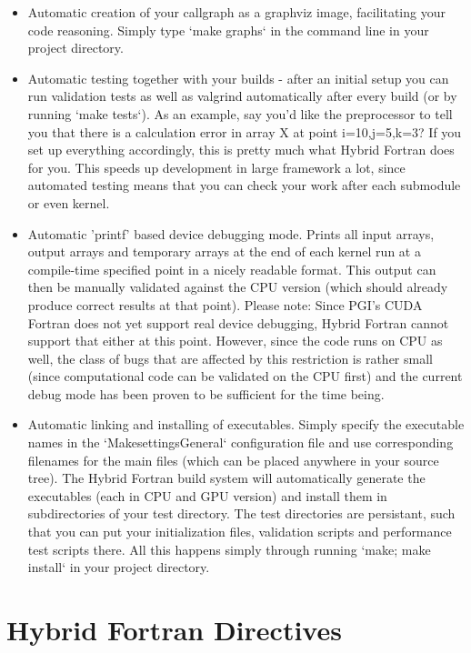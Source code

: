 \begin{itemize}
 \item Automatic creation of your callgraph as a graphviz image, facilitating your code reasoning. Simply type `make graphs` in the command line in your project directory.

 \item Automatic testing together with your builds - after an initial setup you can run validation tests as well as valgrind automatically after every build (or by running `make tests`). As an example, say you'd like the preprocessor to tell you that there is a calculation error in array X at point i=10,j=5,k=3? If you set up everything accordingly, this is pretty much what Hybrid Fortran does for you. This speeds up development in large framework a lot, since automated testing means that you can check your work after each submodule or even kernel.

 \item Automatic 'printf' based device debugging mode. Prints all input arrays, output arrays and temporary arrays at the end of each kernel run at a compile-time specified point in a nicely readable format. This output can then be manually validated against the CPU version (which should already produce correct results at that point). Please note: Since PGI's CUDA Fortran does not yet support real device debugging, Hybrid Fortran cannot support that either at this point. However, since the code runs on CPU as well, the class of bugs that are affected by this restriction is rather small (since computational code can be validated on the CPU first) and the current debug mode has been proven to be sufficient for the time being.

 \item Automatic linking and installing of executables. Simply specify the executable names in the `MakesettingsGeneral` configuration file and use corresponding filenames for the main files (which can be placed anywhere in your source tree). The Hybrid Fortran build system will automatically generate the executables (each in CPU and GPU version) and install them in subdirectories of your test directory. The test directories are persistant, such that you can put your initialization files, validation scripts and performance test scripts there. All this happens simply through running `make; make install` in your project directory.
\end{itemize}

\clearpage
\section{Hybrid Fortran Directives} \label{sec:archDirectives}

